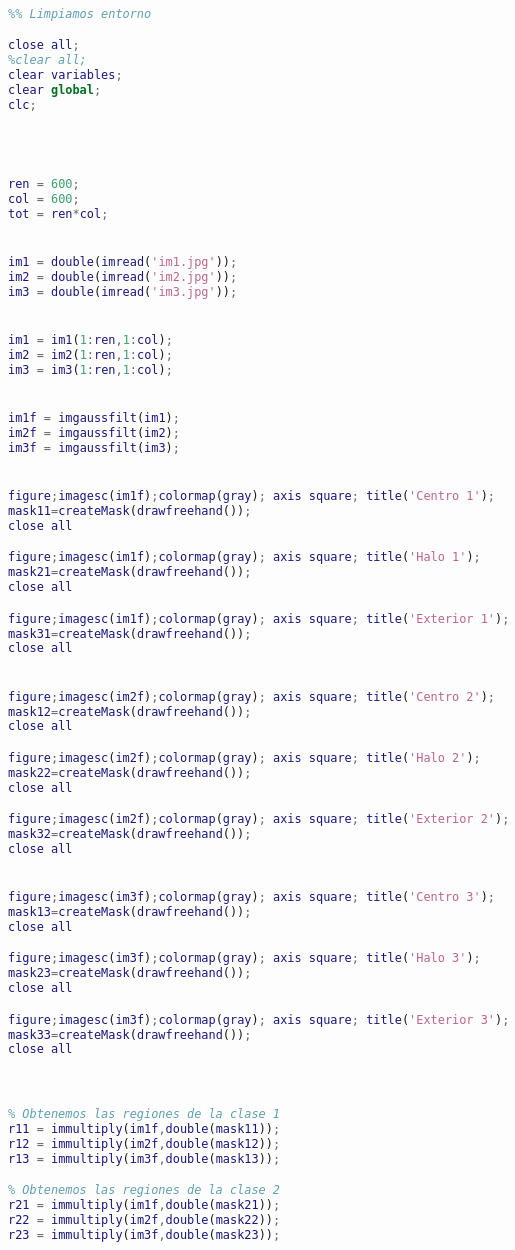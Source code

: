\documentclass[10pt,journal,compsoc]{IEEEtran}\usepackage[T1]{fontenc}                              %
\begin{document}
\begin{lstlisting}[language=Matlab,basicstyle=\small]

%% Limpiamos entorno

close all;
%clear all;
clear variables;
clear global;
clc;
 



ren = 600;
col = 600;
tot = ren*col;


im1 = double(imread('im1.jpg'));
im2 = double(imread('im2.jpg'));
im3 = double(imread('im3.jpg'));


im1 = im1(1:ren,1:col);
im2 = im2(1:ren,1:col);
im3 = im3(1:ren,1:col);


im1f = imgaussfilt(im1);
im2f = imgaussfilt(im2);
im3f = imgaussfilt(im3);


figure;imagesc(im1f);colormap(gray); axis square; title('Centro 1');
mask11=createMask(drawfreehand());
close all

figure;imagesc(im1f);colormap(gray); axis square; title('Halo 1');
mask21=createMask(drawfreehand());
close all

figure;imagesc(im1f);colormap(gray); axis square; title('Exterior 1');
mask31=createMask(drawfreehand());
close all


figure;imagesc(im2f);colormap(gray); axis square; title('Centro 2');
mask12=createMask(drawfreehand());
close all

figure;imagesc(im2f);colormap(gray); axis square; title('Halo 2');
mask22=createMask(drawfreehand());
close all

figure;imagesc(im2f);colormap(gray); axis square; title('Exterior 2');
mask32=createMask(drawfreehand());
close all


figure;imagesc(im3f);colormap(gray); axis square; title('Centro 3');
mask13=createMask(drawfreehand());
close all

figure;imagesc(im3f);colormap(gray); axis square; title('Halo 3');
mask23=createMask(drawfreehand());
close all

figure;imagesc(im3f);colormap(gray); axis square; title('Exterior 3');
mask33=createMask(drawfreehand());
close all



% Obtenemos las regiones de la clase 1
r11 = immultiply(im1f,double(mask11));
r12 = immultiply(im2f,double(mask12));
r13 = immultiply(im3f,double(mask13));

% Obtenemos las regiones de la clase 2
r21 = immultiply(im1f,double(mask21));
r22 = immultiply(im2f,double(mask22));
r23 = immultiply(im3f,double(mask23));


\end{lstlisting}
\end{document}
